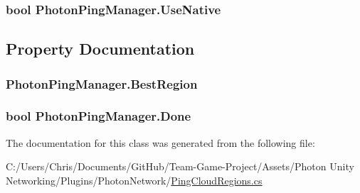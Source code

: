 \subsubsection[{\texorpdfstring{Use\+Native}{UseNative}}]{\setlength{\rightskip}{0pt plus 5cm}bool Photon\+Ping\+Manager.\+Use\+Native}\hypertarget{class_photon_ping_manager_ab5bc2677649632ad08c581dff24cec4a}{}\label{class_photon_ping_manager_ab5bc2677649632ad08c581dff24cec4a}


\subsection{Property Documentation}
\subsubsection[{\texorpdfstring{Best\+Region}{BestRegion}}]{ Photon\+Ping\+Manager.\+Best\+Region\hspace{0.3cm}{\ttfamily [get]}}\hypertarget{class_photon_ping_manager_a81be8a928664c188bfe172c493116f88}{}\label{class_photon_ping_manager_a81be8a928664c188bfe172c493116f88}
\subsubsection[{\texorpdfstring{Done}{Done}}]{\setlength{\rightskip}{0pt plus 5cm}bool Photon\+Ping\+Manager.\+Done\hspace{0.3cm}{\ttfamily [get]}}\hypertarget{class_photon_ping_manager_a5907c89dd76795d37d656c1b21fbe32a}{}\label{class_photon_ping_manager_a5907c89dd76795d37d656c1b21fbe32a}


The documentation for this class was generated from the following file\+:\begin{DoxyCompactItemize}
\item 
C\+:/\+Users/\+Chris/\+Documents/\+Git\+Hub/\+Team-\/\+Game-\/\+Project/\+Assets/\+Photon Unity Networking/\+Plugins/\+Photon\+Network/\hyperlink{_ping_cloud_regions_8cs}{Ping\+Cloud\+Regions.\+cs}\end{DoxyCompactItemize}
